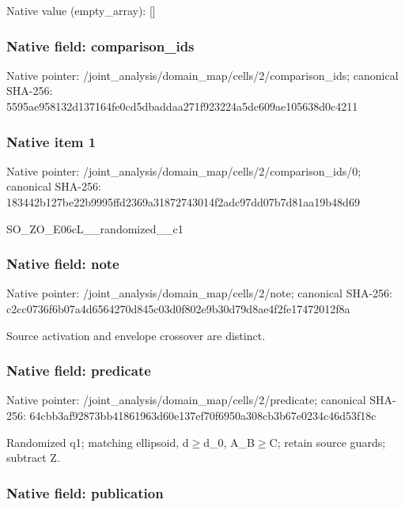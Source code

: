\documentclass[10pt,a4paper]{article}
\begin{document}
Native value (empty\_array): []



\subsubsection{Native field: comparison\_ids}


Native pointer: /joint\_analysis/domain\_m\allowbreak{}ap/cells/2/comparison\_id\allowbreak{}s; canonical SHA-256: 5595ae958132d137164fe0cd\allowbreak{}5dbaddaa271f923224a5dc60\allowbreak{}9ae105638d0c4211



\subsubsection{Native item 1}


Native pointer: /joint\_analysis/domain\_m\allowbreak{}ap/cells/2/comparison\_id\allowbreak{}s/0; canonical SHA-256: 183442b127be22b9995ffd23\allowbreak{}69a31872743014f2adc97dd0\allowbreak{}7b7d81aa19b48d69


SO\_ZO\_E06cL\_\_randomized\_\_c1


\subsubsection{Native field: note}


Native pointer: /joint\_analysis/domain\_map/cells/2/note; canonical SHA-256: c2cc0736f6b07a4d6564270d\allowbreak{}845c03d0f802e9b30d79d8ae\allowbreak{}4f2fe17472012f8a


Source activation and envelope crossover are distinct.


\subsubsection{Native field: predicate}


Native pointer: /joint\_analysis/domain\_m\allowbreak{}ap/cells/2/predicate; canonical SHA-256: 64cbb3af92873bb41861963d\allowbreak{}60e137ef70f6950a308cb3b6\allowbreak{}7e0234c46d53f18c


Randomized q1; matching ellipsoid, d\ensuremath{\ge}d\_0, A\_B\ensuremath{\ge}C; retain source guards; subtract Z.


\subsubsection{Native field: publication}
\end{document}
